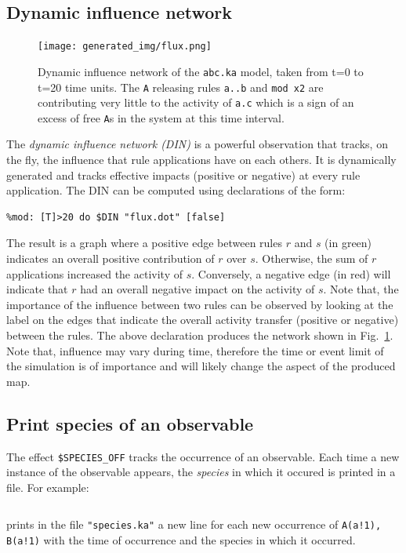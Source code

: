 \documentclass[11pt]{book}
\def\ttt#1{\texttt{#1}}
\begin{document}
\subsection{Dynamic influence network}\label{sec:flux}

\begin{figure}[p] %
   \centering
\texttt{[image: generated\_img/flux.png]}
   \caption{Dynamic influence network of the \ttt{abc.ka} model, taken
     from t=0 to t=20 time units. The \ttt{A} releasing rules
     \ttt{a..b} and \ttt{mod x2} are contributing very little to the
     activity of \ttt{a.c} which is a sign of an excess of free
     \ttt{A}s in the system at this time interval.}
   \label{fig:flux}
\end{figure}
The \emph{dynamic influence network (DIN)}
is a powerful observation that tracks, on the fly, the influence that
rule applications have on each others. It is dynamically generated and
tracks effective impacts (positive or negative) at every rule
application. The DIN can be computed using
declarations of the form:
\begin{lstlisting}[language=kappa]
%mod: [true] do $DIN "flux.dot" [true]
%mod: [T]>20 do $DIN "flux.dot" [false]
\end{lstlisting}
The result is a graph where a positive edge between
rules $r$ and $s$ (in green) indicates an overall positive
contribution of $r$ over $s$. Otherwise, the sum of $r$ applications
increased the activity of $s$. Conversely, a negative
edge (in red) will indicate that $r$ had an overall negative impact on
the activity of $s$. Note that, the importance of the
influence between two rules can be observed by looking at the label on the
edges that indicate the overall activity transfer (positive or
negative) between the rules. The above declaration
produces the network shown in Fig.~\ref{fig:flux}. Note that,
influence may vary during time, therefore the time or event limit of the
simulation is of importance and will likely change the aspect of the
produced map.

\subsection{Print species of an observable}
The effect \ttt{\$SPECIES\_OFF} tracks the occurrence of an observable. Each time a new instance of the observable appears, the \emph{species} in which it occured is printed in a file. For example:
{\begin{lstlisting}[language=kappa]
%mod:$SPECIES_OF "species.ka" A(a!1), B(a!1) [true]
\end{lstlisting}}
prints in the file \ttt{"species.ka"} a new line for each new occurrence of \ttt{A(a!1), B(a!1)} with the time of occurrence and the species in which it occurred.
\end{document}

